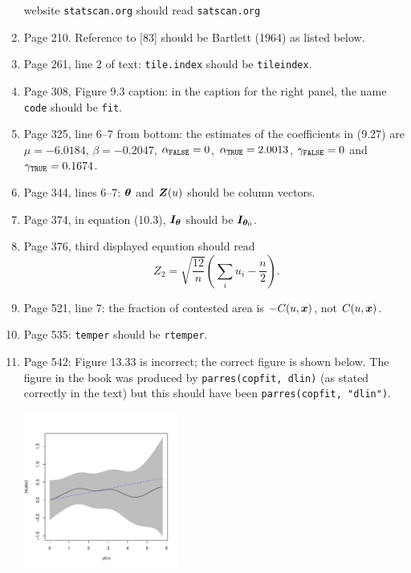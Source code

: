 \documentclass[12pt,a4paper]{article}
\newcommand{\boldmaths}[1]{{\ensuremath\boldsymbol{#1}}}
\newcommand{\bx}{\boldmaths x}
\newcommand{\bZ}{\boldmaths Z}
\newcommand{\btheta}{\boldmaths\theta}
\begin{document}
\begin{enumerate}
 website \texttt{statscan.org} should read \texttt{satscan.org}
\item Page 210. Reference to [83] should be Bartlett (1964)
  as listed below.
\item Page 261, line 2 of text: 
\texttt{tile.index} should be \texttt{tileindex}.
\item Page 308, Figure 9.3 caption: in the caption for the right panel,
the name \texttt{code} should be \texttt{fit}.
\item Page 325, line 6--7 from bottom: the estimates of the coefficients
  in (9.27) are $\mu =-6.0184$, $\beta=-0.2047$,
  $\alpha_{\mbox{\scriptsize \texttt{FALSE}}} = 0$,
  $\alpha_{\mbox{\scriptsize \texttt{TRUE}}} = 2.0013$,
  $\gamma_{\mbox{\scriptsize \texttt{FALSE}}} = 0$ and
  $\gamma_{\mbox{\scriptsize \texttt{TRUE}}} = 0.1674$.
\item Page 344, lines 6--7: $\btheta$ and $\bZ(u)$ 
should be column vectors.
\item Page 374, in equation (10.3), ${\boldmaths I}_\btheta$
  should be ${\boldmaths I}_{\btheta_0}$.
\item Page 376, third displayed equation should read
  \[
       Z_2 = \sqrt{\frac{12}{n}} \left(\sum_i u_i - \frac n 2\right).
  \]
\item Page 521, line 7: the fraction of contested area is $-C(u, \bx)$,
not $C(u,\bx)$.
\item Page 535: \texttt{temper} should be \texttt{rtemper}.
  \pagebreak
\item Page 542: Figure 13.33 is incorrect; the correct figure is shown
  below. The figure in the book was produced by \texttt{parres(copfit, dlin)}
  (as stated correctly in the text)
  but this should have been \texttt{parres(copfit, "dlin")}.

  \centerline{\includegraphics*[width=0.4\textwidth]{fig1333}}
  

\end{enumerate}
\end{document}
